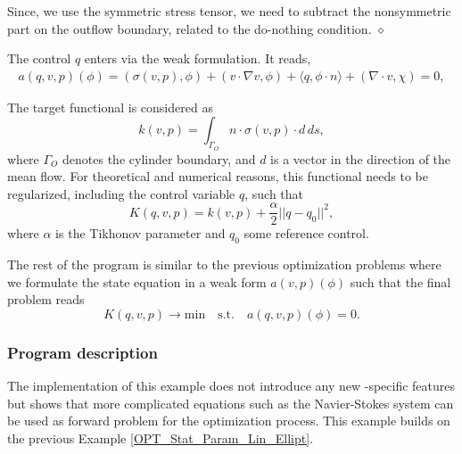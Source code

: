 \begin{remark} Since, we use the 
symmetric stress tensor, we need to subtract the nonsymmetric part 
on the outflow boundary, related to the do-nothing condition.
$\diamond$
\end{remark}

The control $q$ enters via the weak formulation. It reads,
\begin{align*}
a(q,v,p)(\phi) = (\sigma(v,p), \phi) + (v\cdot \nabla v, \phi) 
+ \langle q, \phi\cdot n \rangle + (\nabla\cdot v, \chi) = 0,
\end{align*}




The target functional is considered as 
\[
k(v,p) = \int_{\Gamma_O} n\cdot \sigma(v,p)\cdot d \, ds,
\]
where $\Gamma_O$ denotes the cylinder boundary, and $d$ is a vector in the
direction
of the mean flow. For theoretical and numerical reasons, this functional 
needs to be regularized, including the control variable $q$, such that
\[
K(q,v,p) = k(v,p) + \frac{\alpha}{2}||q - q_0||^2,
\] 
where $\alpha$ is the Tikhonov parameter and $q_0$ some 
reference control. 

The rest of the program is similar to the previous optimization problems where
we formulate the state equation in a weak form $a(v,p)(\phi)$ such that the 
final problem reads
\[
K(q,v,p) \rightarrow \text{min} \quad \text{s.t.} \quad a(q,v,p)(\phi) = 0.
\]


\subsubsection{Program description}
The implementation of this example does not introduce any new \dope{}-specific
features but shows that more complicated equations such as the Navier-Stokes 
system can be used as forward problem for the optimization process. 
This example builds on the previous Example \ref{OPT_Stat_Param_Lin_Ellipt}.

